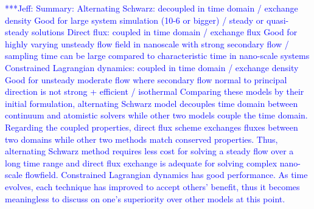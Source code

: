 \documentclass[preprint,12pt]{elsarticle}
\newcommand{\skonote}[1]{ {\textcolor{blue} { ***Jeff: #1 }}}
\newcommand{\skonote}[1]{}
\begin{document}


\skonote{Summary:
Alternating Schwarz: decoupled in time domain / exchange density
Good for large system simulation (10-6 or bigger) / steady or quasi-steady solutions
Direct flux: coupled in time domain / exchange flux
Good for highly varying unsteady flow field in nanoscale with strong secondary flow / sampling time can be large compared to characteristic time in nano-scale systems
Constrained Lagrangian dynamics: coupled in time domain / exchange density
Good for unsteady moderate flow where secondary flow normal to principal direction is not strong + efficient / isothermal
Comparing these models by their initial formulation, alternating Schwarz model decouples time domain between continuum and atomistic solvers while other two models couple the time domain. Regarding the coupled properties, direct flux scheme exchanges fluxes between two domains while other two methods match conserved properties. Thus, alternating Schwarz method requires less cost for solving a steady flow over a long time range and direct flux exchange is adequate for solving complex nano-scale flowfield. Constrained Lagrangian dynamics has good performance. As time evolves, each technique has improved to accept others' benefit, thus it becomes meaningless to discuss on one's superiority over other models at this point.}
\end{document}
